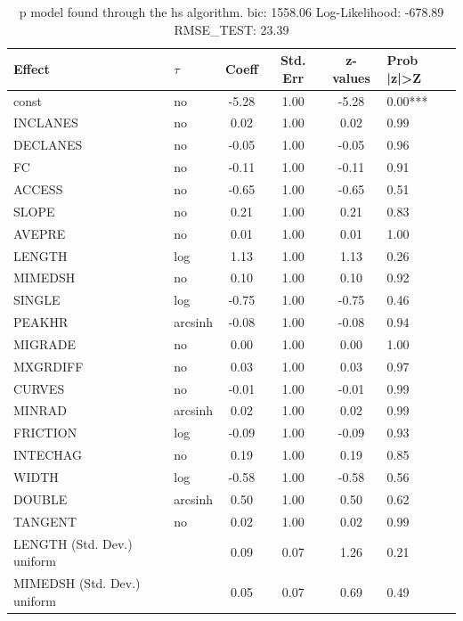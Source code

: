 \begin{table}
	\caption{p model found through the hs algorithm. bic: 1558.06 Log-Likelihood: -678.89 RMSE_TEST: 23.39}
	\begin{center}
		\begin{tabular}{|l|l|c|c|c|l|}
			\hline
			Effect & $\tau$ & Coeff & Std. Err & z-values & Prob |z|>Z \\
			\hline
			const & no & -5.28 & 1.00 & -5.28 & 0.00*** \\
			\hline
			INCLANES & no & 0.02 & 1.00 & 0.02 & 0.99 \\
			\hline
			DECLANES & no & -0.05 & 1.00 & -0.05 & 0.96 \\
			\hline
			FC & no & -0.11 & 1.00 & -0.11 & 0.91 \\
			\hline
			ACCESS & no & -0.65 & 1.00 & -0.65 & 0.51 \\
			\hline
			SLOPE & no & 0.21 & 1.00 & 0.21 & 0.83 \\
			\hline
			AVEPRE & no & 0.01 & 1.00 & 0.01 & 1.00 \\
			\hline
			LENGTH & log & 1.13 & 1.00 & 1.13 & 0.26 \\
			\hline
			MIMEDSH & no & 0.10 & 1.00 & 0.10 & 0.92 \\
			\hline
			SINGLE & log & -0.75 & 1.00 & -0.75 & 0.46 \\
			\hline
			PEAKHR & arcsinh & -0.08 & 1.00 & -0.08 & 0.94 \\
			\hline
			MIGRADE & no & 0.00 & 1.00 & 0.00 & 1.00 \\
			\hline
			MXGRDIFF & no & 0.03 & 1.00 & 0.03 & 0.97 \\
			\hline
			CURVES & no & -0.01 & 1.00 & -0.01 & 0.99 \\
			\hline
			MINRAD & arcsinh & 0.02 & 1.00 & 0.02 & 0.99 \\
			\hline
			FRICTION & log & -0.09 & 1.00 & -0.09 & 0.93 \\
			\hline
			INTECHAG & no & 0.19 & 1.00 & 0.19 & 0.85 \\
			\hline
			WIDTH & log & -0.58 & 1.00 & -0.58 & 0.56 \\
			\hline
			DOUBLE & arcsinh & 0.50 & 1.00 & 0.50 & 0.62 \\
			\hline
			TANGENT & no & 0.02 & 1.00 & 0.02 & 0.99 \\
			\hline
			LENGTH (Std. Dev.) uniform &  & 0.09 & 0.07 & 1.26 & 0.21 \\
			\hline
			MIMEDSH (Std. Dev.) uniform &  & 0.05 & 0.07 & 0.69 & 0.49 \\
			\hline

\end{tabular}
\end{center}
\end{table}

